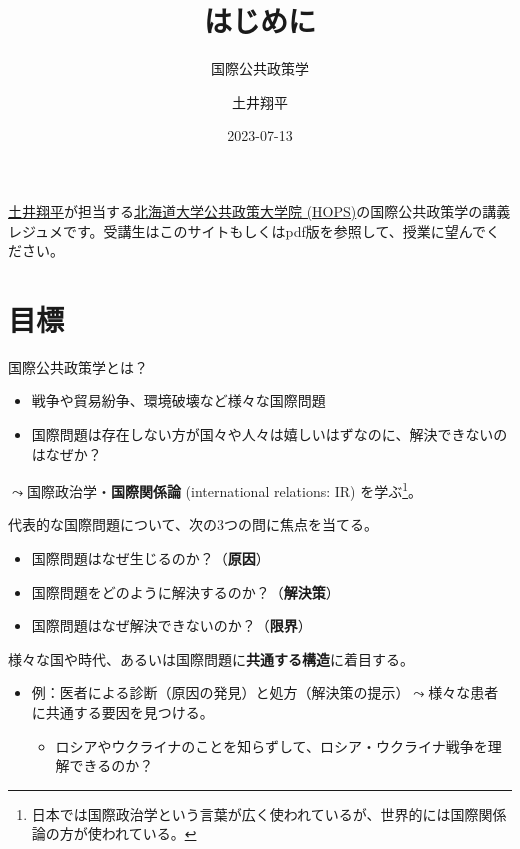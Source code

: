 \documentclass[
  xelatex,
  ja=standard]{bxjsarticle}
\title{はじめに}
\subtitle{国際公共政策学}
\author{土井翔平}
\date{2023-07-13}
\providecommand{\tightlist}{%
  \setlength{\itemsep}{0pt}\setlength{\parskip}{0pt}}\usepackage{longtable,booktabs,array}
\begin{document}
\maketitle
\ifdefined\Shaded\renewenvironment{Shaded}{\begin{tcolorbox}[interior hidden, borderline west={3pt}{0pt}{shadecolor}, breakable, enhanced, boxrule=0pt, frame hidden, sharp corners]}{\end{tcolorbox}}\fi

\href{https://shohei-doi.github.io}{土井翔平}が担当する\href{https://www.hops.hokudai.ac.jp/}{北海道大学公共政策大学院
(HOPS)}の国際公共政策学の講義レジュメです。受講生はこのサイトもしくはpdf版を参照して、授業に望んでください。

\hypertarget{ux76eeux6a19}{%
\section{目標}\label{ux76eeux6a19}}

国際公共政策学とは？

\begin{itemize}
\tightlist
\item
  戦争や貿易紛争、環境破壊など様々な国際問題
\item
  国際問題は存在しない方が国々や人々は嬉しいはずなのに、解決できないのはなぜか？
\end{itemize}

\(\leadsto\)国際政治学・\textbf{国際関係論} (international relations:
IR) を学ぶ\footnote{日本では国際政治学という言葉が広く使われているが、世界的には国際関係論の方が使われている。}。

代表的な国際問題について、次の3つの問に焦点を当てる。

\begin{itemize}
\tightlist
\item
  国際問題はなぜ生じるのか？（\textbf{原因}）
\item
  国際問題をどのように解決するのか？（\textbf{解決策}）
\item
  国際問題はなぜ解決できないのか？（\textbf{限界}）
\end{itemize}

様々な国や時代、あるいは国際問題に\textbf{共通する構造}に着目する。

\begin{itemize}
\tightlist
\item
  例：医者による診断（原因の発見）と処方（解決策の提示）\(\leadsto\)様々な患者に共通する要因を見つける。

  \begin{itemize}
  \tightlist
  \item
    ロシアやウクライナのことを知らずして、ロシア・ウクライナ戦争を理解できるのか？
  \end{itemize}
\end{itemize}
\end{document}
